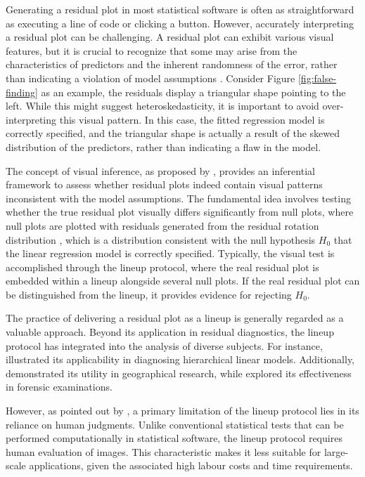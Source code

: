 \documentclass[]{interact}
\theoremstyle{plain}%
\theoremstyle{definition}
\theoremstyle{remark}
\begin{document}
Generating a residual plot in most statistical software is often as
straightforward as executing a line of code or clicking a button.
However, accurately interpreting a residual plot can be challenging. A
residual plot can exhibit various visual features, but it is crucial to
recognize that some may arise from the characteristics of predictors and
the inherent randomness of the error, rather than indicating a violation
of model assumptions \citep{li2023plot}. Consider Figure
\ref{fig:false-finding} as an example, the residuals display a
triangular shape pointing to the left. While this might suggest
heteroskedasticity, it is important to avoid over-interpreting this
visual pattern. In this case, the fitted regression model is correctly
specified, and the triangular shape is actually a result of the skewed
distribution of the predictors, rather than indicating a flaw in the
model.

The concept of visual inference, as proposed by
\citet{buja2009statistical}, provides an inferential framework to assess
whether residual plots indeed contain visual patterns inconsistent with
the model assumptions. The fundamental idea involves testing whether the
true residual plot visually differs significantly from null plots, where
null plots are plotted with residuals generated from the residual
rotation distribution \citep{langsrud2005rotation}, which is a
distribution consistent with the null hypothesis \(H_0\) that the linear
regression model is correctly specified. Typically, the visual test is
accomplished through the lineup protocol, where the real residual plot
is embedded within a lineup alongside several null plots. If the real
residual plot can be distinguished from the lineup, it provides evidence
for rejecting \(H_0\).

The practice of delivering a residual plot as a lineup is generally
regarded as a valuable approach. Beyond its application in residual
diagnostics, the lineup protocol has integrated into the analysis of
diverse subjects. For instance,
\cite{loy2013diagnostic, loy2014hlmdiag, loy2015you} illustrated its
applicability in diagnosing hierarchical linear models. Additionally,
\citet{widen2016graphical} demonstrated its utility in geographical
research, while \citet{krishnan2021hierarchical} explored its
effectiveness in forensic examinations.

However, as pointed out by \citet{li2023plot}, a primary limitation of
the lineup protocol lies in its reliance on human judgments. Unlike
conventional statistical tests that can be performed computationally in
statistical software, the lineup protocol requires human evaluation of
images. This characteristic makes it less suitable for large-scale
applications, given the associated high labour costs and time
requirements.
\end{document}
